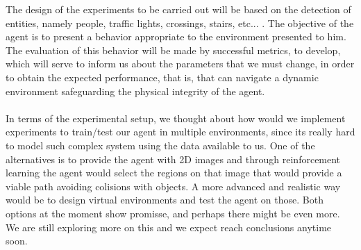 \documentclass[letterpaper,10pt]{article}
\begin{document}
The design of the experiments to be carried out will be based on the 
detection of entities, namely people, traffic lights, crossings, 
stairs, etc... . The objective of the agent is to present a behavior 
appropriate to the environment presented to him. The evaluation of this 
behavior will be made by successful metrics, to develop, which will serve 
to inform us about the parameters that we must change, in order to obtain 
the expected performance, that is, that can navigate a dynamic environment 
safeguarding the physical integrity of the agent.
\\\\
In terms of the experimental setup, we thought about how would we implement
experiments to train/test our agent in multiple environments, since its 
really hard to model such complex system using the data available to us. 
One of the alternatives is to provide the agent with 2D images and through 
reinforcement learning the agent would select the regions on that image that 
would provide a viable path avoiding colisions with objects. A more advanced 
and realistic way would be to design virtual environments and test the agent
on those. Both options at the moment show promisse, and perhaps there might 
be even more. We are still exploring more on this and we expect reach 
conclusions anytime soon.
\printbibliography
\end{document}
